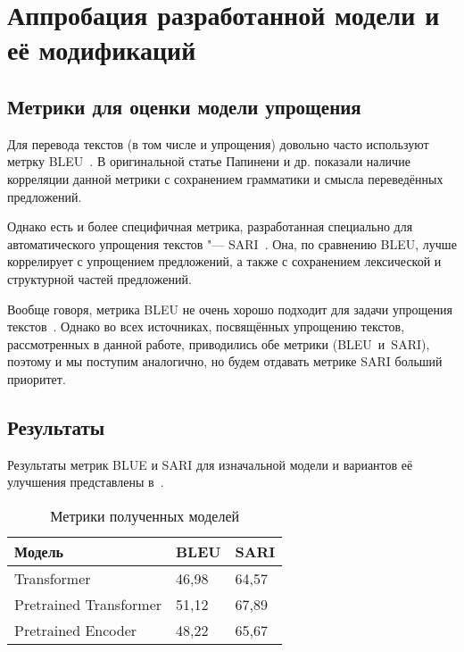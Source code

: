 

\chapter{Аппробация разработанной модели и её модификаций}


\section{Метрики для оценки модели упрощения}


Для перевода текстов (в том числе и упрощения) довольно часто используют метрку BLEU~\cite{BLEU}.
В оригинальной статье Папинени и др. показали наличие корреляции данной метрики с сохранением грамматики и смысла переведённых предложений.

Однако есть и более специфичная метрика, разработанная специально для автоматического упрощения текстов "--- SARI~\cite{SARI}.
Она, по сравнению BLEU, лучше коррелирует с упрощением предложений, а также с сохранением лексической и структурной частей предложений.

Вообще говоря, метрика BLEU не очень хорошо подходит для задачи упрощения текстов~\cite{bleu-is-dogshit}.
Однако во всех источниках, посвящённых упрощению текстов, рассмотренных в данной работе, приводились обе метрики (BLEU~и~SARI), поэтому и мы поступим аналогично, но будем отдавать метрике SARI больший приоритет.


\section{Результаты}


Результаты метрик BLUE и SARI для изначальной модели и вариантов её улучшения представлены в~.

\begin{table}[H]%
  \centering\small
  \caption{Метрики полученных моделей}
  \label{metrics}
    \begin{tabular}{|l|l|l|}
      \hline
      \textbf{Модель} & \textbf{BLEU} & \textbf{SARI} \\ \hline
      Transformer & 46{,}98 & 64{,}57 \\ \hline
      Pretrained Transformer & 51{,}12 & 67{,}89 \\ \hline
      Pretrained Encoder & 48{,}22 & 65{,}67 \\ \hline
    \end{tabular}
    \normalsize
\end{table}

